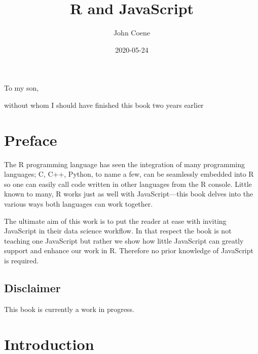 \documentclass[
]{krantz}
\title{R and JavaScript}
\author{John Coene}
\date{2020-05-24}
\begin{document}
\maketitle


\thispagestyle{empty}

\begin{center}
To my son,

without whom I should have finished this book two years earlier
\end{center}

\setlength{\abovedisplayskip}{-5pt}
\setlength{\abovedisplayshortskip}{-5pt}

{
\hypersetup{linkcolor=}
\setcounter{tocdepth}{2}
\tableofcontents
}
\listoftables
\listoffigures
\hypertarget{preface}{%
\chapter*{Preface}\label{preface}}


The R programming language has seen the integration of many programming languages; C, C++, Python, to name a few, can be seamlessly embedded into R so one can easily call code written in other languages from the R console. Little known to many, R works just as well with JavaScript---this book delves into the various ways both languages can work together.

The ultimate aim of this work is to put the reader at ease with inviting JavaScript in their data science workflow. In that respect the book is not teaching one JavaScript but rather we show how little JavaScript can greatly support and enhance our work in R. Therefore no prior knowledge of JavaScript is required.

\hypertarget{disclaimer}{%
\section{Disclaimer}\label{disclaimer}}

This book is currently a work in progress.

\mainmatter

\hypertarget{intro}{%
\chapter{Introduction}\label{intro}}
\end{document}
